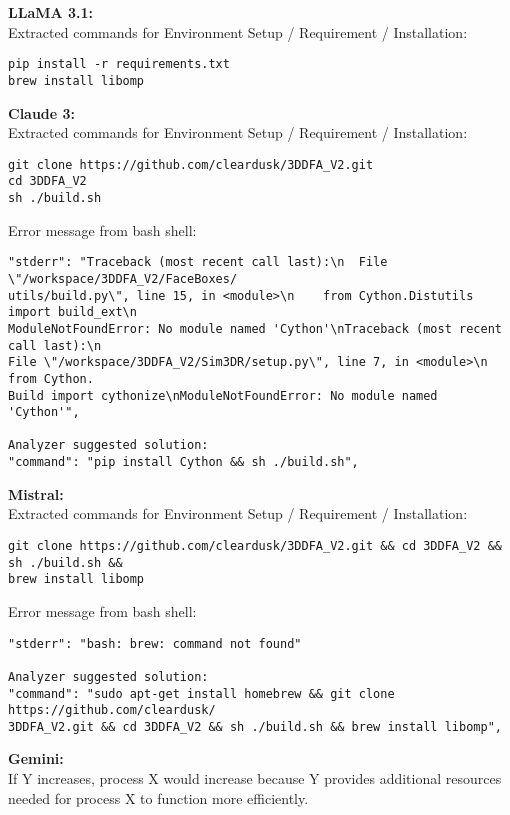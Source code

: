\begin{table*}[th!]
\fontsize{9.0pt}{\baselineskip}\selectfont
\linespread{0.9}\selectfont

\begin{mybody}
\textbf{LLaMA 3.1:}\\
Extracted commands for Environment Setup / Requirement / Installation:
\begin{verbatim}
pip install -r requirements.txt
brew install libomp
\end{verbatim}
\end{mybody}

\begin{mybody}
\textbf{Claude 3:}\\
Extracted commands for Environment Setup / Requirement / Installation:
\begin{verbatim}
git clone https://github.com/cleardusk/3DDFA_V2.git
cd 3DDFA_V2
sh ./build.sh
\end{verbatim}

Error message from bash shell:
\begin{verbatim}
"stderr": "Traceback (most recent call last):\n  File \"/workspace/3DDFA_V2/FaceBoxes/
utils/build.py\", line 15, in <module>\n    from Cython.Distutils import build_ext\n
ModuleNotFoundError: No module named 'Cython'\nTraceback (most recent call last):\n  
File \"/workspace/3DDFA_V2/Sim3DR/setup.py\", line 7, in <module>\n    from Cython.
Build import cythonize\nModuleNotFoundError: No module named 'Cython'",

Analyzer suggested solution:
"command": "pip install Cython && sh ./build.sh",
\end{verbatim}
\end{mybody}

\begin{mybody}
\textbf{Mistral:}\\
Extracted commands for Environment Setup / Requirement / Installation:
\begin{verbatim}
git clone https://github.com/cleardusk/3DDFA_V2.git && cd 3DDFA_V2 && sh ./build.sh &&
brew install libomp
\end{verbatim}

Error message from bash shell:
\begin{verbatim}
"stderr": "bash: brew: command not found"

Analyzer suggested solution:
"command": "sudo apt-get install homebrew && git clone https://github.com/cleardusk/
3DDFA_V2.git && cd 3DDFA_V2 && sh ./build.sh && brew install libomp",
\end{verbatim}
\end{mybody}
\iffalse
\begin{mybody}
\textbf{Gemini:}\\
If Y increases, process X would increase because Y provides additional resources 
needed for process X to function more efficiently.


\end{mybody}
\end{table*}
